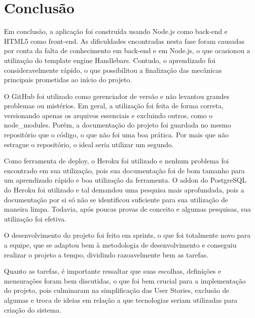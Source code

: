 \chapter*[Conclusão]{Conclusão}
Em conclusão, a aplicação foi construída usando Node.js como back-end e HTML5 como front-end. As dificuldades encontradas nesta fase foram causadas por conta da falta de conhecimento em back-end e em Node.js, o que ocasionou a utilização do template engine Handlebars. Contudo, o aprendizado foi consideravelmente rápido, o que possibilitou a finalização das mecânicas principais prometidas ao início do projeto.

O GitHub foi utilizado como gerenciador de versão e não levantou grandes problemas ou mistérios. Em geral, a utilização foi feita de forma correta, versionando apenas os arquivos essenciais e excluindo outros, como o node\_modules. Porém, a documentação do projeto foi guardada no mesmo repositório que o código, o que não foi uma boa prática. Por mais que não estrague o repositório, o ideal seria utilizar um segundo.

Como ferramenta de deploy, o Heroku foi utilizado e nenhum problema foi encontrado em sua utilização, pois sua documentação foi de bom tamanho para um aprendizado rápido e boa utilização da ferramenta. O addon do PostgreSQL do Heroku foi utilizado e tal demandou uma pesquisa mais aprofundada, pois a documentação por si só não se identificou suficiente para sua utilização de maneira limpa. Todavia, após poucas provas de conceito e algumas pesquisas, sua utilização foi efetiva.

O desenvolvimento do projeto foi feito em sprints, o que foi totalmente novo para a equipe, que se adaptou bem à metodologia de desenvolvimento e conseguiu realizar o projeto a tempo, dividindo razoavelmente bem as tarefas. 

Quanto as tarefas, é importante ressaltar que suas escolhas, definições e mensurações foram bem discutidas, o que foi bem crucial para a implementação do projeto, pois culminaram na simplificação das User Stories, exclusão de algumas e troca de ideias em relação a que tecnologias seriam utilizadas para criação do sistema.

